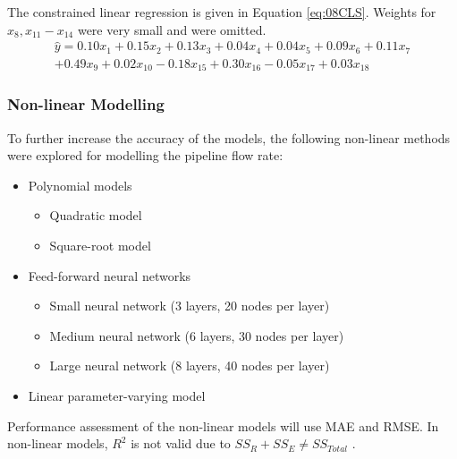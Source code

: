 The constrained linear regression is given in Equation \ref{eq:08CLS}.  Weights for $x_{8}, x_{11} - x_{14}$ were very small and were omitted.
\begin{multline}
    \hat{y} = 0.10x_1 + 0.15x_2 + 0.13x_3 + 0.04x_4 + 0.04x_5 + 0.09x_6 + 0.11x_7 \\
    + 0.49x_9 + 0.02x_{10}  - 0.18x_{15} + 0.30x_{16} - 0.05x_{17} + 0.03x_{18}
    \label{eq:08CLS}
\end{multline}

\subsubsection{Non-linear Modelling}
To further increase the accuracy of the models, the following non-linear methods were explored for modelling the pipeline flow rate:
\begin{itemize}
    \item Polynomial models
    \begin{itemize}
        \item Quadratic model
        \item Square-root model
    \end{itemize}
    \item Feed-forward neural networks
    \begin{itemize}
        \item Small neural network (3 layers, 20 nodes per layer)
        \item Medium neural network (6 layers, 30 nodes per layer)
        \item Large neural network (8 layers, 40 nodes per layer)
    \end{itemize}
    \item Linear parameter-varying model
\end{itemize}

Performance assessment of the non-linear models will use MAE and RMSE. In non-linear models, $R^2$ is not valid due to $SS_R + SS_E \neq SS_{Total}$ \cite{generic_stats}.

